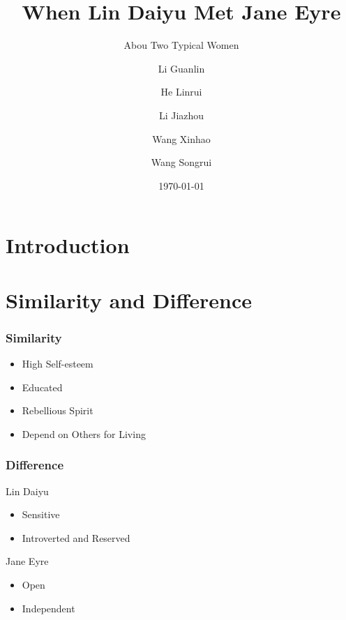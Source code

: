 \documentclass{beamer}
\title[About Women]
{When Lin Daiyu Met Jane Eyre}
\subtitle{Abou Two Typical Women}
\author[] %
{Li Guanlin\inst{1} \and He Linrui\inst{1} \and Li Jiazhou \inst{1} \and Wang Xinhao \inst{1} \and Wang Songrui \inst{1}}
\institute[NJU] %
{
\inst{1}%
Undergraduates of ICS\\
Nanjing University
}
\date[NJU 2023] %
{\today}
\begin{document}
\begin{frame}
    \titlepage
    \begin{figure}[htpb]
    \end{figure}
\end{frame}

\begin{frame}
    \tableofcontents[sectionstyle=show,subsectionstyle=show/shaded/hide,subsubsectionstyle=show/shaded/hide]
\end{frame}

\section{Introduction}

\section{Similarity and Difference}

\begin{frame}
    \frametitle{Similarity}
    \Large
    \begin{itemize}[<+->]
        \item High Self-esteem
        \item Educated
        \item Rebellious Spirit
        \item Depend on Others for Living
    \end{itemize}
\end{frame}

\begin{frame}
    \frametitle{Difference}
    \Large
    \begin{block}{Lin Daiyu}
        \begin{itemize}
            \item Sensitive
            \item Introverted and Reserved
        \end{itemize}        
    \end{block}
    \begin{block}{Jane Eyre}
        \begin{itemize}
            \item Open 
            \item Independent
        \end{itemize}
    \end{block}
\end{frame}
\end{document}
